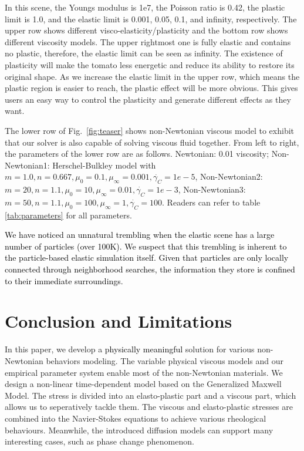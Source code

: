 \documentclass[10pt,journal,compsoc]{IEEEtran}
\newcommand{\revised}[1]{{\textcolor{black}{#1}}}
\begin{document}
In this scene, the Youngs modulus is 1e7, the Poisson ratio is 0.42, the plastic limit is 1.0, and the elastic limit is 0.001, 0.05, 0.1, and infinity, respectively. The upper row shows different visco-elasticity/plasticity and the bottom row shows different viscosity models.
The upper rightmost one is fully elastic and contains no plastic, therefore, the elastic limit can be seen as infinity. The existence of plasticity will make the tomato less energetic and reduce its ability to restore its original shape. As we increase the elastic limit in the upper row, which means the plastic region is easier to reach, the plastic effect will be more obvious. This gives users an easy way to control the plasticity and generate different effects as they want.

The lower row of Fig.~\ref{fig:teaser} shows non-Newtonian viscous model to exhibit that our solver is also capable of solving viscous fluid together. From left to right, the parameters  of the lower row are as follows.   Newtonian: 0.01 viscosity; Non-Newtonian1: Herschel-Bulkley model with $m=1.0, n=0.667, \mu_0=0.1, \mu_{\infty}=0.001, \dot{\gamma_C}=1e-5$, Non-Newtonian2: $m=20, n=1.1, \mu_0=10, \mu_{\infty}=0.01, \dot{\gamma_C}=1e-3$,  Non-Newtonian3: $m=50, n=1.1, \mu_0=100,\mu_{\infty}=1, \dot{\gamma_C}=100$. Readers can refer to table \ref{tab:parameters} for all parameters.

\revised{We have noticed an unnatural trembling when the elastic scene has a large number of particles (over 100K).%
We suspect that this trembling is inherent to the particle-based elastic simulation itself. Given that particles are only locally connected through neighborhood searches, the information they store is confined to their immediate surroundings.} %

\section{Conclusion and Limitations}
In this paper, we develop a \revised{physically meaningful} solution for various non-Newtonian behaviors modeling. The variable physical viscous models and our empirical parameter system enable most of the non-Newtonian materials. We design a non-linear time-dependent model based on the Generalized Maxwell Model. The stress is divided into an elasto-plastic part and a viscous part, which allows us to seperatively tackle them.  The viscous and elasto-plastic stresses are combined into the Navier-Stokes equations to achieve various rheological behaviours. Meanwhile, the introduced diffusion models can support many interesting cases, such as phase change phenomenon.
\end{document}
